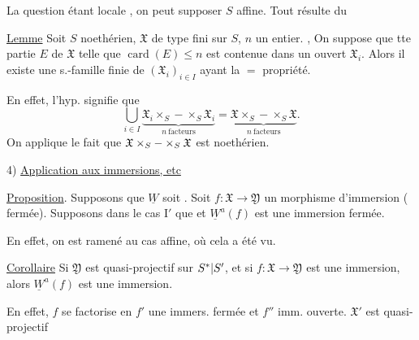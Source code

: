 La question étant locale , on peut supposer $S$ affine.
Tout résulte du

\uline{Lemme} Soit $S$ noethérien, $\mathfrak X$ de type fini sur $S$,
$n$ un entier. ,
On suppose que tte partie  $E$ de $\mathfrak X$ telle que
$\operatorname{card}(E)\leq n$ est contenue dans un ouvert
 $\mathfrak X_i$. Alors il existe une s.-famille finie
de $(\mathfrak X_i)_{i\in I}$ ayant la $=$ propriété.

En effet, l'hyp. signifie que
\[
\bigcup_{i\in I}\underbrace{\mathfrak X_i\times_S-\times_S\mathfrak X_i}_{n\ \text{facteurs}}
=\underbrace{\mathfrak X\times_S-\times_S\mathfrak X}_{n\ \text{facteurs}}.
\]
On applique le fait que $\mathfrak X\times_S-\times_S\mathfrak X$
est  noethérien.


4) \uline{Application aux immersions, etc}

\uline{Proposition}. Supposons que $\underline W$ soit
.
Soit $f:\mathfrak X\to\mathfrak Y$ un morphisme d'immersion
( fermée).
Supposons  
dans le cas $\mathrm I'$ que
et $\underline W^a(f)$  est une immersion fermée.

En effet, on est ramené au cas affine, où cela a été vu.

\uline{Corollaire}
Si $\mathfrak Y$ est quasi-projectif sur $S^*|S'$,
et si $f:\mathfrak X\to\mathfrak Y$ est une immersion,
alors $\underline W^a(f)$ est une immersion.

En effet, $f$ se factorise en
 $f'$ une immers. fermée et $f''$ imm.
ouverte. $\mathfrak X'$ est quasi-projectif 


